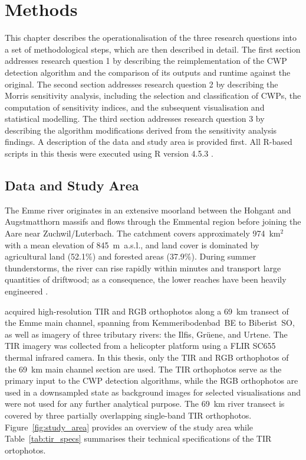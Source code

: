 \chapter{Methods}

This chapter describes the operationalisation of the three research questions 
into a set of methodological steps, which are then described in detail. The 
first section addresses research question 1 by describing the reimplementation 
of the CWP detection algorithm and the comparison of its outputs and runtime 
against the original. The second section addresses research question 2 by 
describing the Morris sensitivity analysis, including the selection and 
classification of CWPs, the computation of sensitivity indices, and the 
subsequent visualisation and statistical modelling. The third section addresses 
research question 3 by describing the algorithm modifications derived from the 
sensitivity analysis findings. A description of the data and study area is 
provided first. All R-based scripts in this thesis were executed using R version 4.5.3 
\citep{r_core_team}.

\section{Data and Study Area}

The Emme river originates in an extensive moorland between the Hohgant and 
Augstmatthorn massifs and flows through the Emmental region before joining 
the Aare near Zuchwil/Luterbach. The catchment covers approximately 
974~km$^2$ with a mean elevation of 845~m~a.s.l., and land cover is 
dominated by agricultural land (52.1\%) and forested areas (37.9\%). 
During summer thunderstorms, the river can rise rapidly within minutes 
and transport large quantities of driftwood; as a consequence, the lower 
reaches have been heavily engineered \citep{tonolla_thermische-kartographie_2026}.

\citet{tonolla_thermische-kartographie_2026} acquired high-resolution TIR 
and RGB orthophotos along a 69~km transect of the Emme main channel, 
spanning from Kemmeribodenbad~BE to Biberist~SO, as well as imagery of 
three tributary rivers: the Ilfis, Grüene, and Urtene. The TIR imagery was 
collected from a helicopter platform using a FLIR SC655 thermal infrared 
camera. In this thesis, only the TIR and RGB orthophotos of the 69~km 
main channel section are used. The TIR orthophotos serve as the primary 
input to the CWP detection algorithms, while the RGB orthophotos are used 
in a downsampled state as background images for selected visualisations 
and were not used for any further analytical purpose. The 69~km river 
transect is covered by three partially overlapping single-band TIR 
orthophotos. Figure~\ref{fig:study_area} provides an overview of the study 
area while Table~\ref{tab:tir_specs} 
summarises their technical specifications of the TIR ortophotos.

